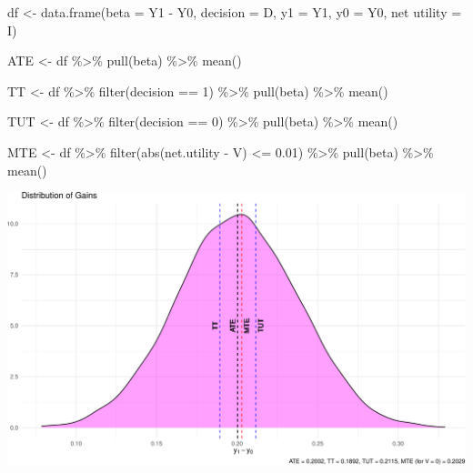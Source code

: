 \documentclass[9pt,twocolumn,twoside,]{pnas-new}
\newenvironment{Shaded}{}{}
\newcommand{\DecValTok}[1]{\textcolor[rgb]{0.25,0.63,0.44}{#1}}
\newcommand{\FloatTok}[1]{\textcolor[rgb]{0.25,0.63,0.44}{#1}}
\newcommand{\FunctionTok}[1]{\textcolor[rgb]{0.02,0.16,0.49}{#1}}
\newcommand{\NormalTok}[1]{#1}
\newcommand{\OtherTok}[1]{\textcolor[rgb]{0.00,0.44,0.13}{#1}}
\newcommand{\SpecialCharTok}[1]{\textcolor[rgb]{0.25,0.44,0.63}{#1}}
\newcommand{\StringTok}[1]{\textcolor[rgb]{0.25,0.44,0.63}{#1}}
\begin{document}
\begin{Shaded}
\begin{Highlighting}[]
\NormalTok{df }\OtherTok{\textless{}{-}} \FunctionTok{data.frame}\NormalTok{(}\StringTok{\textquotesingle{}beta\textquotesingle{}} \OtherTok{=}\NormalTok{ Y1 }\SpecialCharTok{{-}}\NormalTok{ Y0,}
                 \StringTok{\textquotesingle{}decision\textquotesingle{}} \OtherTok{=}\NormalTok{ D,}
                 \StringTok{\textquotesingle{}y1\textquotesingle{}} \OtherTok{=}\NormalTok{ Y1,}
                 \StringTok{\textquotesingle{}y0\textquotesingle{}} \OtherTok{=}\NormalTok{ Y0,}
                 \StringTok{\textquotesingle{}net utility\textquotesingle{}} \OtherTok{=}\NormalTok{ I)}

\NormalTok{ATE }\OtherTok{\textless{}{-}}\NormalTok{ df }\SpecialCharTok{\%\textgreater{}\%}
    \FunctionTok{pull}\NormalTok{(beta) }\SpecialCharTok{\%\textgreater{}\%} 
    \FunctionTok{mean}\NormalTok{()}

\NormalTok{TT }\OtherTok{\textless{}{-}}\NormalTok{ df }\SpecialCharTok{\%\textgreater{}\%}
    \FunctionTok{filter}\NormalTok{(decision }\SpecialCharTok{==} \DecValTok{1}\NormalTok{) }\SpecialCharTok{\%\textgreater{}\%}
    \FunctionTok{pull}\NormalTok{(beta) }\SpecialCharTok{\%\textgreater{}\%}
    \FunctionTok{mean}\NormalTok{()}

\NormalTok{TUT }\OtherTok{\textless{}{-}}\NormalTok{ df }\SpecialCharTok{\%\textgreater{}\%}
    \FunctionTok{filter}\NormalTok{(decision }\SpecialCharTok{==} \DecValTok{0}\NormalTok{) }\SpecialCharTok{\%\textgreater{}\%}
    \FunctionTok{pull}\NormalTok{(beta) }\SpecialCharTok{\%\textgreater{}\%}
    \FunctionTok{mean}\NormalTok{()}

\NormalTok{MTE }\OtherTok{\textless{}{-}}\NormalTok{ df }\SpecialCharTok{\%\textgreater{}\%}
    \FunctionTok{filter}\NormalTok{(}\FunctionTok{abs}\NormalTok{(net.utility }\SpecialCharTok{{-}}\NormalTok{ V) }\SpecialCharTok{\textless{}=} \FloatTok{0.01}\NormalTok{) }\SpecialCharTok{\%\textgreater{}\%}
    \FunctionTok{pull}\NormalTok{(beta) }\SpecialCharTok{\%\textgreater{}\%}
    \FunctionTok{mean}\NormalTok{()}
\end{Highlighting}
\end{Shaded}

\begin{center}\includegraphics[width=0.85\linewidth,]{hw1_files/figure-latex/unnamed-chunk-2-1} \end{center}
\end{document}
